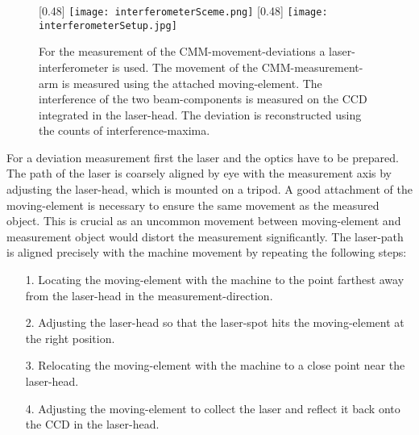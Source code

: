 \documentclass[
twoside,            %
BCOR1.4cm,          %
10pt,               %
headings=normal,    %
headsepline,        %
clearplainpage,		%
final,              %
div=14,
open=right,
bibliography=toc
]{scrreprt}
\begin{document}
\begin{figure}[!h]
	\centering
	[0.48\textwidth]
	{\texttt{[image: interferometerSceme.png]}}
	\hfill
	[0.48\textwidth]
	{\texttt{[image: interferometerSetup.jpg]}}
	\vspace{-2mm}
	\caption{
		For the measurement of the CMM-movement-deviations a laser-interferometer is used.
		The movement of the CMM-measurement-arm is measured using the attached moving-element.
		The interference of the two beam-components is measured on the CCD integrated in the laser-head.
		The deviation is reconstructed using the counts of interference-maxima.
	}
	\label{interferometer}
\end{figure}

For a deviation measurement first the laser and the optics have to be prepared.
The path of the laser is coarsely aligned by eye with the measurement axis by adjusting the laser-head, which is mounted on a tripod.
A good attachment of the moving-element is necessary to ensure the same movement as the measured object.
This is crucial as an uncommon movement between moving-element and measurement object would distort the measurement significantly.
The laser-path is aligned precisely with the machine movement by repeating the following steps:

\begin{itemize}
	\item[1.]
		Locating the moving-element with the machine to the point farthest away from the laser-head in the measurement-direction.
	\item[2.]
		Adjusting the laser-head so that the laser-spot hits the moving-element at the right position.
	\item[3.]
		Relocating the moving-element with the machine to a close point near the laser-head.
	\item[4.]
		Adjusting the moving-element to collect the laser and reflect it back onto the CCD in the laser-head.
\end{itemize}
\end{document}
